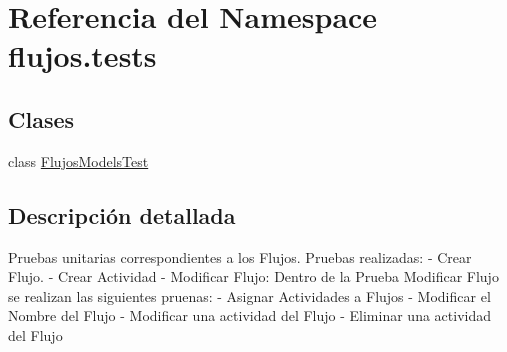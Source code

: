 \hypertarget{namespaceflujos_1_1tests}{}\section{Referencia del Namespace flujos.\+tests}
\label{namespaceflujos_1_1tests}
\subsection*{Clases}
\begin{DoxyCompactItemize}
\item 
class \hyperlink{classflujos_1_1tests_1_1_flujos_models_test}{Flujos\+Models\+Test}
\end{DoxyCompactItemize}


\subsection{Descripción detallada}
\begin{DoxyVerb}Pruebas unitarias correspondientes a los Flujos.
Pruebas realizadas:
    - Crear Flujo.
    - Crear Actividad
    - Modificar Flujo: Dentro de la Prueba Modificar Flujo se realizan las siguientes pruenas:
        - Asignar Actividades a Flujos
        - Modificar el Nombre del Flujo
        - Modificar una actividad del Flujo
        - Eliminar una actividad del Flujo
\end{DoxyVerb}
 
